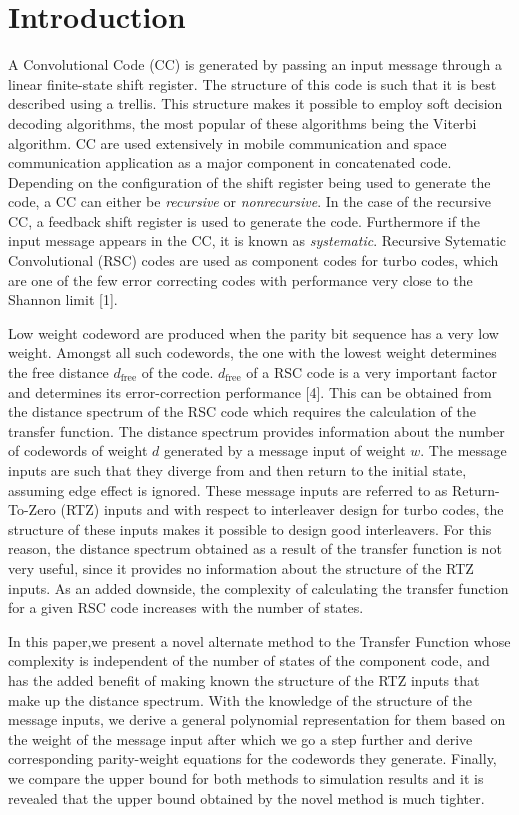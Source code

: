 \section{Introduction}
A Convolutional Code (CC) is generated by passing an input message through a linear finite-state shift register. The structure of this code is such that it is best described using a trellis. This structure makes it possible to employ soft decision decoding algorithms, the most popular of these algorithms being the Viterbi algorithm. CC are used extensively in mobile communication and space communication application as a major component in concatenated code.  Depending on the configuration of the shift register being used to generate the code, a CC can either be \textit{recursive} or \textit{nonrecursive}. In the case of the recursive CC, a feedback shift register is used to generate the code. Furthermore if the input message appears in the CC, it is known as \textit{systematic}. Recursive Sytematic Convolutional (RSC) codes are used as component codes for turbo codes, which are one of the few error correcting codes with performance very close to the Shannon limit [1].

Low weight codeword are produced when the parity bit sequence has a very low weight. Amongst all such codewords, the one with the lowest weight determines the free distance $d_{\text{free}}$ of the code. 
$d_{\text{free}}$  of a RSC code is a very important factor and determines its error-correction performance [4].  This can be obtained from the distance spectrum of the RSC code which requires the calculation of the transfer function. The distance spectrum provides information about the number of codewords of weight $d$ generated by a message input of weight $w$. 
The message inputs are such that they diverge from and then return to the initial state, assuming edge effect is ignored. These message inputs are referred to as Return-To-Zero (RTZ) inputs and with respect to interleaver design for turbo codes, the structure of these inputs makes it possible to design good interleavers.
For this reason, the distance spectrum obtained as a result of the transfer function is not very useful, since it provides no information about the structure of the RTZ inputs. As an added downside, the complexity of calculating the transfer function for a given RSC code increases with the number of states.

In this paper,we present a novel alternate method to the Transfer Function whose complexity is independent of the number of states of the component code, and has the added benefit of making known the structure of the RTZ inputs that make up the distance spectrum.
With the knowledge of the structure of the message inputs, we derive a general polynomial representation for them based on the weight of the message input after which we go a step further and derive corresponding parity-weight equations for the codewords they generate.
Finally, we compare the upper bound for both methods to simulation results and it is revealed that the upper bound obtained by the novel method is much tighter.

